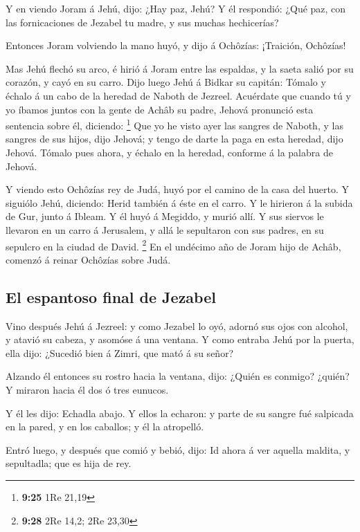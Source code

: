  Y en viendo Joram á Jehú, dijo: ¿Hay paz, Jehú? Y él
respondió: ¿Qué paz, con las fornicaciones de Jezabel tu madre, y sus
muchas hechicerías?

 Entonces Joram volviendo la mano huyó, y dijo á Ochôzías:
¡Traición, Ochôzías!

 Mas Jehú flechó su arco, é hirió á Joram entre las
espaldas, y la saeta salió por su corazón, y cayó en su carro.
 Dijo luego Jehú á Bidkar su capitán: Tómalo y échalo á un
cabo de la heredad de Naboth de Jezreel. Acuérdate que cuando tú y yo
íbamos juntos con la gente de Achâb su padre, Jehová pronunció esta
sentencia sobre él, diciendo: \footnote{\textbf{9:25} 1Re 21,19}
 Que yo he visto ayer las sangres de Naboth, y las sangres
de sus hijos, dijo Jehová; y tengo de darte la paga en esta heredad,
dijo Jehová. Tómalo pues ahora, y échalo en la heredad, conforme á la
palabra de Jehová.

 Y viendo esto Ochôzías rey de Judá, huyó por el camino de
la casa del huerto. Y siguiólo Jehú, diciendo: Herid también á éste en
el carro. Y le hirieron á la subida de Gur, junto á Ibleam. Y él huyó á
Megiddo, y murió allí.  Y sus siervos le llevaron en un
carro á Jerusalem, y allá le sepultaron con sus padres, en su sepulcro
en la ciudad de David. \footnote{\textbf{9:28} 2Re 14,2; 2Re 23,30}
 En el undécimo año de Joram hijo de Achâb, comenzó á
reinar Ochôzías sobre Judá.

\hypertarget{el-espantoso-final-de-jezabel}{%
\subsection{El espantoso final de
Jezabel}\label{el-espantoso-final-de-jezabel}}

 Vino después Jehú á Jezreel: y como Jezabel lo oyó, adornó
sus ojos con alcohol, y atavió su cabeza, y asomóse á una ventana.
 Y como entraba Jehú por la puerta, ella dijo: ¿Sucedió
bien á Zimri, que mató á su señor?

 Alzando él entonces su rostro hacia la ventana, dijo:
¿Quién es conmigo? ¿quién? Y miraron hacia él dos ó tres eunucos.

 Y él les dijo: Echadla abajo. Y ellos la echaron: y parte
de su sangre fué salpicada en la pared, y en los caballos; y él la
atropelló.

 Entró luego, y después que comió y bebió, dijo: Id ahora á
ver aquella maldita, y sepultadla; que es hija de rey.

